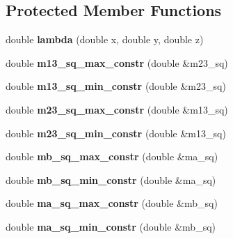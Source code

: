 \subsection*{Protected Member Functions}
\begin{DoxyCompactItemize}
\item 
\hypertarget{class_amp_sum_slice_intensity_a4bbe6e0b6b52ad563a1ad88372269d70}{double {\bfseries lambda} (double x, double y, double z)}\label{class_amp_sum_slice_intensity_a4bbe6e0b6b52ad563a1ad88372269d70}

\item 
\hypertarget{class_amp_sum_slice_intensity_af1d052cb4d842fa0c138720bbca1e3c0}{double {\bfseries m13\-\_\-sq\-\_\-max\-\_\-constr} (double \&m23\-\_\-sq)}\label{class_amp_sum_slice_intensity_af1d052cb4d842fa0c138720bbca1e3c0}

\item 
\hypertarget{class_amp_sum_slice_intensity_ace69c74b9f40855821e2176953a8c0e7}{double {\bfseries m13\-\_\-sq\-\_\-min\-\_\-constr} (double \&m23\-\_\-sq)}\label{class_amp_sum_slice_intensity_ace69c74b9f40855821e2176953a8c0e7}

\item 
\hypertarget{class_amp_sum_slice_intensity_aa090b258891725259e61686abbf4ef8c}{double {\bfseries m23\-\_\-sq\-\_\-max\-\_\-constr} (double \&m13\-\_\-sq)}\label{class_amp_sum_slice_intensity_aa090b258891725259e61686abbf4ef8c}

\item 
\hypertarget{class_amp_sum_slice_intensity_ad8c7b32e6980dff167248aef0173796d}{double {\bfseries m23\-\_\-sq\-\_\-min\-\_\-constr} (double \&m13\-\_\-sq)}\label{class_amp_sum_slice_intensity_ad8c7b32e6980dff167248aef0173796d}

\item 
\hypertarget{class_amp_sum_slice_intensity_a65040ff02976a9822736d54376f00473}{double {\bfseries mb\-\_\-sq\-\_\-max\-\_\-constr} (double \&ma\-\_\-sq)}\label{class_amp_sum_slice_intensity_a65040ff02976a9822736d54376f00473}

\item 
\hypertarget{class_amp_sum_slice_intensity_a4ebb653e40a69fdc1da2a33d995b2d19}{double {\bfseries mb\-\_\-sq\-\_\-min\-\_\-constr} (double \&ma\-\_\-sq)}\label{class_amp_sum_slice_intensity_a4ebb653e40a69fdc1da2a33d995b2d19}

\item 
\hypertarget{class_amp_sum_slice_intensity_a143f11330f52d2073aaee9603ff8a574}{double {\bfseries ma\-\_\-sq\-\_\-max\-\_\-constr} (double \&mb\-\_\-sq)}\label{class_amp_sum_slice_intensity_a143f11330f52d2073aaee9603ff8a574}

\item 
\hypertarget{class_amp_sum_slice_intensity_aaa93035c162cfa0c02f06c27382d17d9}{double {\bfseries ma\-\_\-sq\-\_\-min\-\_\-constr} (double \&mb\-\_\-sq)}\label{class_amp_sum_slice_intensity_aaa93035c162cfa0c02f06c27382d17d9}

\end{DoxyCompactItemize}
